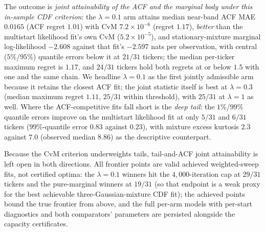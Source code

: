 The outcome is \emph{joint attainability of the ACF and the marginal body under this in-sample CDF criterion}: the $\lambda = 0.1$ arm attains median near-band ACF MAE $0.0165$ (ACF regret $1.01$) with CvM $7.2 \times 10^{-6}$ (regret $1.17$), \emph{better} than the multistart likelihood fit's own CvM ($5.2 \times 10^{-5}$), and stationary-mixture marginal log-likelihood $-2.608$ against that fit's $-2.597$ nats per observation, with central ($5\%$/$95\%$) quantile errors below it at $21/31$ tickers; the median per-ticker maximum regret is $1.17$, and $24/31$ tickers hold both regrets at or below $1.5$ with one and the same chain. We headline $\lambda = 0.1$ as the first jointly admissible arm because it retains the closest ACF fit; the joint statistic itself is best at $\lambda = 0.3$ (median maximum regret $1.11$, $25/31$ within threshold), with $25/31$ at $\lambda = 1$ as well. Where the ACF-competitive fits fall short is the \emph{deep tail}: the $1\%$/$99\%$ quantile errors improve on the multistart likelihood fit at only $5/31$ and $6/31$ tickers ($99\%$-quantile error $0.83$ against $0.23$), with mixture excess kurtosis $2.3$ against $7.0$ (observed median $8.86$) as the descriptive counterpart.

Because the CvM criterion underweights tails, tail-and-ACF joint attainability is left open in both directions. All frontier points are valid achieved weighted-sweep fits, not certified optima: the $\lambda = 0.1$ winners hit the $4{,}000$-iteration cap at $29/31$ tickers and the pure-marginal winners at $19/31$ (so that endpoint is a weak proxy for the best achievable three-Gaussian-mixture CDF fit); the achieved points bound the true frontier from above, and the full per-arm models with per-start diagnostics and both comparators' parameters are persisted alongside the capacity certificates.

